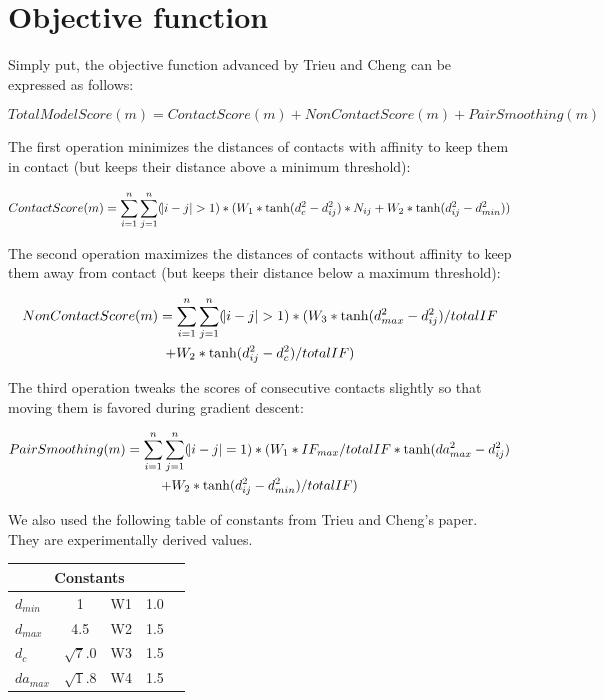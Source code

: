 \documentclass{article}
\begin{document}
\section{Objective function}

Simply put, the objective function advanced by Trieu and Cheng can be expressed as follows:

\begin{equation}
      TotalModelScore(m) = ContactScore(m) + NonContactScore(m) + PairSmoothing(m)
\end{equation}

The first operation minimizes the distances of contacts with affinity to keep them in contact (but keeps their distance above a minimum threshold):

\begin{equation}
      ContactScore(m) = \sum_{i=1}^{n} \sum_{j=1}^{n} (\abs{i-j}>1) * (W_1 * \tanh(d_c^2-d_{ij}^2) * N_{ij} + W_2 * \tanh(d_{ij}^2-d_{min}^2))
\end{equation}

The second operation maximizes the distances of contacts without affinity to keep them away from contact (but keeps their distance below a maximum threshold):

\begin{multline}
      NonContactScore(m) = \sum_{i=1}^{n} \sum_{j=1}^{n} (\abs{i-j}>1) * (W_3 * \tanh(d_{max}^2-d_{ij}^2) / totalIF \\+ W_2 * \tanh(d_{ij}^2-d_{c}^2) / totalIF)
\end{multline}

The third operation tweaks the scores of consecutive contacts slightly so that moving them is favored during gradient descent:

\begin{multline}
      PairSmoothing(m) = \sum_{i=1}^{n} \sum_{j=1}^{n} (\abs{i-j}=1) * (W_1 * IF_{max} / totalIF * \tanh(da_{max}^2-d_{ij}^2) \\+ W_2 * \tanh(d_{ij}^2-d_{min}^2) / totalIF)
\end{multline}

We also used the following table of constants from Trieu and Cheng's paper.  They are experimentally derived values.

\begin{center}
\begin{tabular}{|l|c|c|c|r|}
\multicolumn{4}{c}{Constants} \\
    \hline
    $d_{min}$ & 1 & W1 & 1.0           \\ \hline
    $d_{max}$ & 4.5  & W2 & 1.5      \\ \hline
    $d_{c}$ & $\sqrt 7.0$  & W3 & 1.5            \\ \hline
    $da_{max}$ & $\sqrt 1.8$  & W4 & 1.5     \\ \hline
    \end{tabular}
\end{center}
\end{document}
